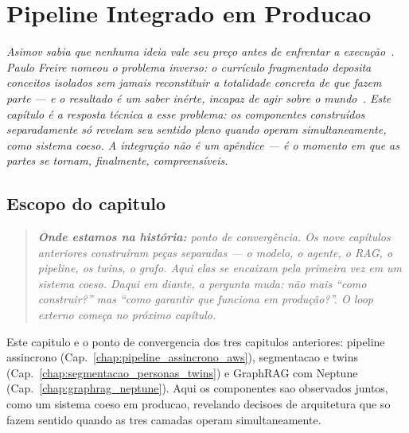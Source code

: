 \chapter{Pipeline Integrado em Producao}
\label{chap:pipeline_integrado_producao}

{\small\itshape\color{AccentGray}
Asimov sabia que nenhuma ideia vale seu pre\c{c}o antes de enfrentar a execu\c{c}\~{a}o~\cite{asimov1989secrets}. Paulo Freire nomeou o problema inverso: o curr\'{i}culo fragmentado deposita conceitos isolados sem jamais reconstituir a totalidade concreta de que fazem parte --- e o resultado \'{e} um saber in\'{e}rte, incapaz de agir sobre o mundo~\cite{freire1968pedagogia}. Este cap\'{i}tulo \'{e} a resposta t\'{e}cnica a esse problema: os componentes constru\'{i}dos separadamente s\'{o} revelam seu sentido pleno quando operam simultaneamente, como sistema coeso. A integra\c{c}\~{a}o n\~{a}o \'{e} um ap\^{e}ndice --- \'{e} o momento em que as partes se tornam, finalmente, compreens\'{i}veis.\par}
\vspace{0.6em}
\section{Escopo do capitulo}

\begin{quote}\itshape
\textbf{Onde estamos na hist\'oria:} ponto de converg\^encia.
Os nove cap\'itulos anteriores constru\'iram pe\c{c}as separadas
--- o modelo, o agente, o RAG, o pipeline, os twins, o grafo.
Aqui elas se encaixam pela primeira vez em um sistema coeso.
Daqui em diante, a pergunta muda: n\~ao mais ``como construir?''
mas ``como garantir que funciona em produ\c{c}\~ao?''. O loop
externo come\c{c}a no pr\'oximo cap\'itulo.
\end{quote}

Este capitulo e o ponto de convergencia dos tres capitulos anteriores:
pipeline assincrono (Cap.~\ref{chap:pipeline_assincrono_aws}),
segmentacao e twins (Cap.~\ref{chap:segmentacao_personas_twins}) e
GraphRAG com Neptune (Cap.~\ref{chap:graphrag_neptune}).
Aqui os componentes sao observados juntos, como um sistema coeso em
producao, revelando decisoes de arquitetura que so fazem sentido quando
as tres camadas operam simultaneamente.

